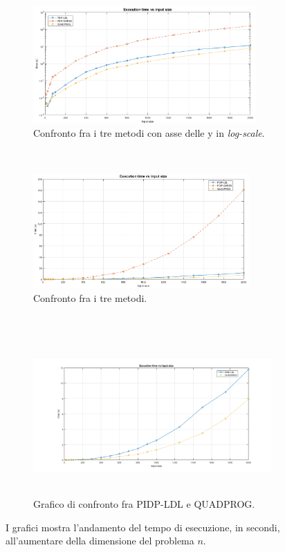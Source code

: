 \begin{figure}[h!]
    \centering
    \begin{subfigure}[h]{0.5\textwidth}
        \centering
        \includegraphics[height=4.52cm]{img/MU1.png}
    \caption{Confronto fra i tre metodi con asse delle y in \textit{log-scale}.\label{fig:exp111}}
    \end{subfigure}%
    ~ 
    \begin{subfigure}[h]{0.5\textwidth}
        \centering
                \includegraphics[height=4.4cm]{img/MU10.png}
    \caption{Confronto fra i tre metodi. \label{fig:exp112}}
    \end{subfigure}
    ~\newline
     \begin{subfigure}[h]{0.8\textwidth}
        \centering
                \includegraphics[height=6cm]{img/MU11.png}
    \caption{Grafico di confronto fra PIDP-LDL e QUADPROG. \label{fig:exp113}}
    \end{subfigure}
    \caption{I grafici mostra l'andamento del tempo di esecuzione, in secondi, all'aumentare della dimensione del problema $n$. \label{fig:exp1}}
\end{figure}


